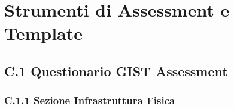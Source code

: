
\chapter{Strumenti di Assessment e Template}
\label{app:assessment}

\section{C.1 Questionario GIST Assessment}

\subsection{C.1.1 Sezione Infrastruttura Fisica}

